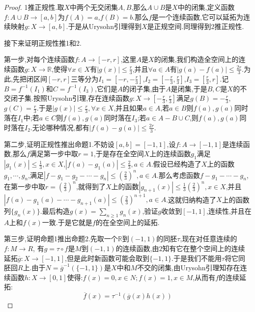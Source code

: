 \begin{proof}
	
	1推正规性.取$X$中两个无交闭集$A,B$,那么$A\cup B$是$X$中的闭集,定义函数$f:A\cup B\to[a,b]$为$f(A)=a$,$f(B)=b$.那么$f$是一个连续函数,它可以延拓为连续映射$g:X\to[a,b]$.于是从Urysohn引理得到$X$是正规空间.同理得到2推正规性.
	
	接下来证明正规性推1和2.
	
	第一步,对每个连续函数$f:A\to[-r,r]$,这里$A$是$X$的闭集,我们构造全空间上的连续函数$g:X\to\mathbb{R}$,使得$\forall x\in X$有$|g(x)|\le\frac{r}{3}$,并且$\forall a\in A$有$|g(a)-f(a)|\le\frac{2r}{3}$.为此,先把闭区间$[-r,r]$三等分为$I_1=[-r,-\frac{r}{3}]$,$I_2=[-\frac{r}{3},\frac{r}{3}]$,$I_3=[\frac{r}{3},r]$.记$B=f^{-1}(I_1)$和$C=f^{-1}(I_3)$,它们是$A$的闭子集,由于$A$是闭集,于是$B,C$是$X$的不交闭子集.按照Urysohn引理,存在连续函数$g:X\to[-\frac{r}{3},\frac{r}{3}]$满足$g(B)=-\frac{r}{3}$,$g(C)=\frac{r}{3}$.于是$|g(x)|\le\frac{r}{3},\forall x\in X$,并且如果$a\in A$,若$a\in B$则$f(a),g(a)$同时落在$I_1$中;若$a\in C$则$f(a),g(a)$同时落在$I_3$;若$a\in A-B\cup C$,则$f(a),g(a)$同时落在$I_2$.无论哪种情况,都有$|f(a)-g(a)|\le\frac{2r}{3}$.
	
	第二步,证明正规性推出命题1.不妨设$[a,b]=[-1,1]$,设$f:A\to[-1,1]$是连续函数,那么$f$满足第一步中取$r=1$,于是存在全空间$X$上的连续函数$g_1$满足$|g_1(x)|\le\frac{1}{3},x\in X$,$|f(a)-g_1(a)|\le\frac{2}{3},a\in A$.假设已经构造了$X$上的函数$g_1,\cdots,g_n$,满足$\left|f-g_1-g_2-\cdots-g_n\right|\le\left(\frac{2}{3}\right)^n,a\in A$.那么考虑函数$f-g_1-\cdots-g_n$,在第一步中取$r=\left(\frac{2}{3}\right)^n$,就得到了$X$上的函数$|g_{n+1}(x)|\le\frac{1}{3}\left(\frac{2}{3}\right)^n,x\in X$,并且$\left|f(a)-g_1(a)-\cdots-g_{n+1}(a)\right|\le\left(\frac{2}{3}\right)^{n+1},a\in A$.这就归纳构造了$X$上的函数列$\{g_n(x)\}$.最后构造$g(x)=\sum_{n\ge1}g_n(x)$,验证$g$收敛到$[-1,1]$,连续性,并且在$A$上和$f(x)$一致.于是它就是$f$的在全空间上的延拓.
	
	第三步,证明命题1推出命题2.先取一个$\mathbb{R}$到$(-1,1)$的同胚$\tau$,现在对任意连续的$f:M\to R$, 有$g=\tau\circ f$是$M$到$(-1,1)$的连续函数,由$2$知有它在整个空间上的连续延拓$\overline{g}:X\to[-1,1]$,但是此时新函数可能会取到$\{-1,1\}$.于是我们不能用$\tau$将它同胚回$R$上.由于$N=\overline{g}^{-1}(\{-1,1\})$是$X$中和$M$不交的闭集,由Urysohn引理知存在连续函数$h:X\to[0,1]$使得:$f(x)=0,x\in N;f(x)=1,x\in M$,从而有$f$的连续延拓:
	$$\overline{f}(x)=\tau^{-1}\left(\overline{g}(x)h(x)\right)$$
\end{proof}

